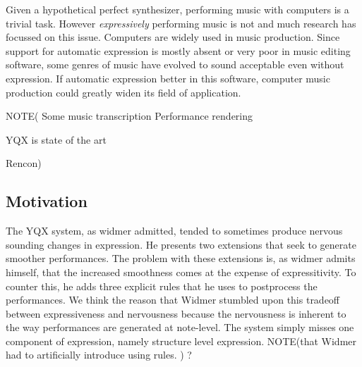\documentclass[a4paper,10pt]{article}
\begin{document}
Given a hypothetical perfect synthesizer, performing music with computers is a trivial task. However \textit{expressively} performing music is not and much research has focussed on this issue. Computers are widely used in music production. Since support for automatic expression is mostly absent or very poor in music editing software, some genres of music have evolved to sound acceptable even without expression. If automatic expression better in this software, computer music production could greatly widen its field of application.

NOTE(
Some music transcription
Performance rendering

YQX is state of the art

Rencon)




\subsection{Motivation}

The YQX system, as widmer admitted, tended to sometimes produce nervous sounding changes in expression. He presents two extensions that seek to generate smoother performances. The problem with these extensions is, as widmer admits himself, that the increased smoothness comes at the expense of expressitivity. To counter this, he adds three explicit rules that he uses to postprocess the performances. We think the reason that Widmer stumbled upon this tradeoff between expressiveness and nervousness because the nervousness is inherent to the way performances are generated at note-level. The system simply misses one component of expression, namely structure level expression. 
NOTE(that Widmer had to artificially introduce using rules. ) ?
\end{document}
